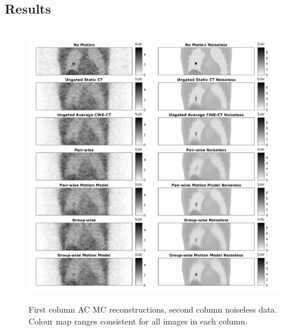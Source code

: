 \documentclass[misc, color=UCLburgundy, margin=1cm]{uclposter}
\begin{document}
\begin{multicols}{4}
        \section*{Results}
            \begin{figure}[H]
                \centering
                \hbox{\hspace{-1.0cm} \includegraphics[width=1.1\linewidth]{visual_analysis.png}}
                \begin{highlightbox}[UCLlightblue]
                    \captionsetup{singlelinecheck=false, justification=centering}
                    \caption{First column \gls{AC} \gls{MC} reconstructions, second column noiseless data. Colour map ranges consistent for all images in each column.}
                \end{highlightbox}
            \end{figure}
            

\end{multicols}
\end{document}
